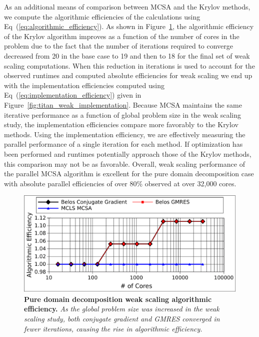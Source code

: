 As an additional means of comparison between MCSA and the Krylov
methods, we compute the algorithmic efficiencies of the calculations
using Eq~(\ref{eq:algorithmic_efficiency}). As shown in
Figure~\ref{fig:titan_weak_algorithmic}, the algorithmic efficiency of
the Krylov algorithm improves as a function of the number of cores in
the problem due to the fact that the number of iterations required to
converge decreased from 20 in the base case to 19 and then to 18 for
the final set of weak scaling computations. When this reduction in
iterations is used to account for the observed runtimes and computed
absolute efficiencies for weak scaling we end up with the
implementation efficiencies computed using
Eq~(\ref{eq:implementation_efficiency}) given in
Figure~\ref{fig:titan_weak_implementation}. Because MCSA maintains the
same iterative performance as a function of global problem size in the
weak scaling study, the implementation efficiencies compare more
favorably to the Krylov methods. Using the implementation efficiency,
we are effectively measuring the parallel performance of a single
iteration for each method. If optimization has been performed and
runtimes potentially approach those of the Krylov methods, this
comparison may not be as favorable. Overall, weak scaling performance
of the parallel MCSA algorithm is excellent for the pure domain
decomposition case with absolute parallel efficiencies of over 80\%
observed at over 32,000 cores.

\begin{figure}[t!]
  \begin{center}
    \includegraphics[width=6in]{chapters/parallel_mc/titan_weak_alg_eff.pdf}
  \end{center}
  \caption{\textbf{Pure domain decomposition weak scaling algorithmic
      efficiency.} \textit{As the global problem size was increased in
      the weak scaling study, both conjugate gradient and GMRES
      converged in fewer iterations, causing the rise in algorithmic
      efficiency.}}
  \label{fig:titan_weak_algorithmic}
\end{figure}

